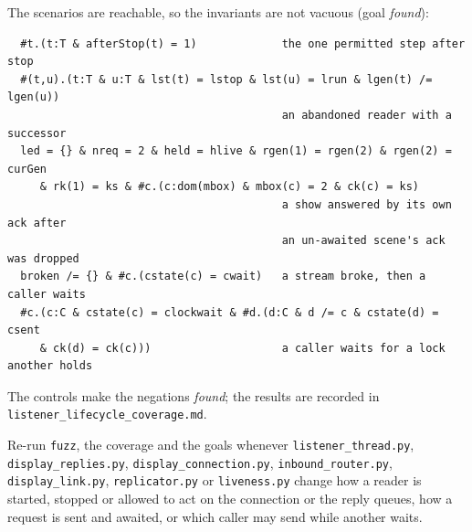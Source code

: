 \documentclass[a4paper,10pt,fleqn]{article}
\begin{document}
The scenarios are reachable, so the invariants are not vacuous (goal
\emph{found}):
\begin{verbatim}
  #t.(t:T & afterStop(t) = 1)             the one permitted step after stop
  #(t,u).(t:T & u:T & lst(t) = lstop & lst(u) = lrun & lgen(t) /= lgen(u))
                                          an abandoned reader with a successor
  led = {} & nreq = 2 & held = hlive & rgen(1) = rgen(2) & rgen(2) = curGen
     & rk(1) = ks & #c.(c:dom(mbox) & mbox(c) = 2 & ck(c) = ks)
                                          a show answered by its own ack after
                                          an un-awaited scene's ack was dropped
  broken /= {} & #c.(cstate(c) = cwait)   a stream broke, then a caller waits
  #c.(c:C & cstate(c) = clockwait & #d.(d:C & d /= c & cstate(d) = csent
     & ck(d) = ck(c)))                    a caller waits for a lock another holds
\end{verbatim}

The controls make the negations \emph{found}; the results are recorded in
\texttt{listener\_lifecycle\_coverage.md}.

Re-run \texttt{fuzz}, the coverage and the goals whenever
\texttt{listener\_thread.py}, \texttt{display\_replies.py},
\texttt{display\_connection.py}, \texttt{inbound\_router.py},
\texttt{display\_link.py}, \texttt{replicator.py} or \texttt{liveness.py}
change how a reader is started, stopped or allowed to act on the connection or
the reply queues, how a request is sent and awaited, or which caller may send
while another waits.
\end{document}
